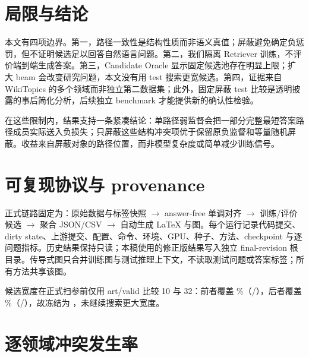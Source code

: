 \documentclass[sigconf,review,anonymous]{acmart}
\begin{document}
\section{局限与结论}

本文有四项边界。第一，路径一致性是结构性质而非语义真值；屏蔽避免确定负惩罚，但不证明候选足以回答自然语言问题。第二，我们隔离 Retriever 训练，不评价端到端生成答案。第三，Candidate Oracle 显示固定候选池存在明显上限；扩大 beam 会改变研究问题，本文没有用 test 搜索更宽候选。第四，证据来自 WikiTopics 的多个领域而非独立第二数据集；此外，固定屏蔽 test 比较是透明披露的事后简化分析，后续独立 benchmark 才能提供新的确认性检验。

在这些限制内，结果支持一条紧凑结论：单路径弱监督会把一部分完整最短答案路径成员实际送入负损失；只屏蔽这些结构冲突项优于保留原负监督和等量随机屏蔽。收益来自屏蔽对象的路径位置，而非模型复杂度或简单减少训练信号。




\appendix

\section{可复现协议与 provenance}

正式链路固定为：原始数据与标签快照 $\rightarrow$ answer-free 单调对齐 $\rightarrow$ 训练/评价候选 $\rightarrow$ 聚合 JSON/CSV $\rightarrow$ 自动生成 LaTeX 与图。每个运行记录代码提交、dirty state、上游提交、配置、命令、环境、GPU、种子、方法、checkpoint 与逐问题指标。历史结果保持只读；本稿使用的修正版结果写入独立 final-revision 根目录。传导式图只合并训练图与测试推理上下文，不读取测试问题或答案标签；所有方法共享该图。

候选宽度在正式扫参前仅用 art/valid 比较 10 与 32：前者覆盖 \BeamTenCoverage\%（\BeamTenReachableCount/\BeamValidationQueryCount），后者覆盖 \BeamThirtyTwoCoverage\%（\BeamThirtyTwoReachableCount/\BeamValidationQueryCount），故冻结为 \SelectedBeamWidth{}，未继续搜索更大宽度。

\section{逐领域冲突发生率}

\begin{table}[H]
  \centering
  \caption{实际采样负例的逐领域路径一致冲突统计。}
  \label{tab:prevalence}
  \resizebox{\columnwidth}{!}{}
\end{table}
\end{document}

